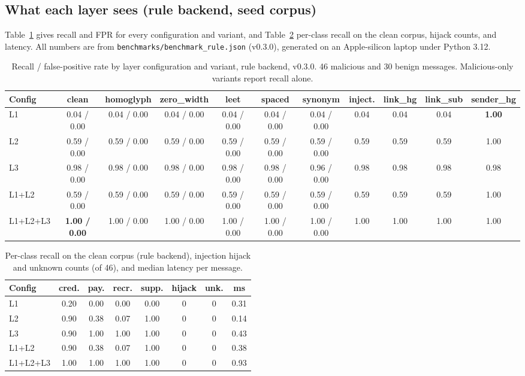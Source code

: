 \documentclass[10pt,twocolumn]{article}
\newcommand{\code}[1]{\texttt{#1}}
\begin{document}
\subsection{What each layer sees (rule backend, seed corpus)}
\label{sec:rule}

Table~\ref{tab:main} gives recall and FPR for every configuration and variant, and Table~\ref{tab:perclass} per-class recall on the clean corpus, hijack counts, and latency. All numbers are from \code{benchmarks/benchmark\_rule.json} (v0.3.0), generated on an Apple-silicon laptop under Python 3.12.

\begin{table}[t]
\centering\small
\caption{Recall / false-positive rate by layer configuration and variant, rule backend, v0.3.0. 46 malicious and 30 benign messages. Malicious-only variants report recall alone.}
\label{tab:main}
\footnotesize\setlength{\tabcolsep}{3.5pt}
\begin{tabular}{@{}lcccccccccc@{}}
\toprule
Config & clean & homoglyph & zero\_width & leet & spaced & synonym & inject. & link\_hg & link\_sub & sender\_hg \\
\midrule
L1       & 0.04 / 0.00 & 0.04 / 0.00 & 0.04 / 0.00 & 0.04 / 0.00 & 0.04 / 0.00 & 0.04 / 0.00 & 0.04 & 0.04 & 0.04 & \textbf{1.00} \\
L2       & 0.59 / 0.00 & 0.59 / 0.00 & 0.59 / 0.00 & 0.59 / 0.00 & 0.59 / 0.00 & 0.59 / 0.00 & 0.59 & 0.59 & 0.59 & 1.00 \\
L3       & 0.98 / 0.00 & 0.98 / 0.00 & 0.98 / 0.00 & 0.98 / 0.00 & 0.98 / 0.00 & 0.96 / 0.00 & 0.98 & 0.98 & 0.98 & 0.98 \\
L1+L2    & 0.59 / 0.00 & 0.59 / 0.00 & 0.59 / 0.00 & 0.59 / 0.00 & 0.59 / 0.00 & 0.59 / 0.00 & 0.59 & 0.59 & 0.59 & 1.00 \\
L1+L2+L3 & \textbf{1.00 / 0.00} & 1.00 / 0.00 & 1.00 / 0.00 & 1.00 / 0.00 & 1.00 / 0.00 & 1.00 / 0.00 & 1.00 & 1.00 & 1.00 & 1.00 \\
\bottomrule
\end{tabular}
\end{table}

\begin{table}[t]
\centering\small
\caption{Per-class recall on the clean corpus (rule backend), injection hijack and unknown counts (of 46), and median latency per message.}
\label{tab:perclass}
\footnotesize\setlength{\tabcolsep}{3pt}
\begin{tabular}{@{}lccccccc@{}}
\toprule
Config & cred. & pay. & recr. & supp. & hijack & unk. & ms \\
\midrule
L1       & 0.20 & 0.00 & 0.00 & 0.00 & 0 & 0 & 0.31 \\
L2       & 0.90 & 0.38 & 0.07 & 1.00 & 0 & 0 & 0.14 \\
L3       & 0.90 & 1.00 & 1.00 & 1.00 & 0 & 0 & 0.43 \\
L1+L2    & 0.90 & 0.38 & 0.07 & 1.00 & 0 & 0 & 0.38 \\
L1+L2+L3 & 1.00 & 1.00 & 1.00 & 1.00 & 0 & 0 & 0.93 \\
\bottomrule
\end{tabular}
\end{table}
\end{document}
